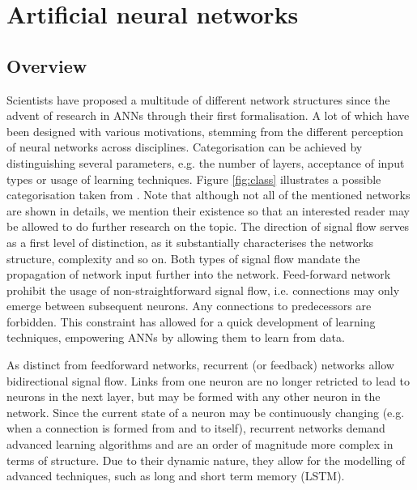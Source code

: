 \documentclass[10pt,a4paper,DIV=11]{scrreprt}
\begin{document}
\chapter{Artificial neural networks}
\label{ch:ANN}
\section{Overview}

Scientists have proposed a multitude of different network structures since the advent of research in ANNs through their first formalisation. 
A lot of which have been designed with various motivations, stemming from the different perception of neural networks across disciplines.
Categorisation can be achieved by distinguishing several parameters, e.g. the number of layers, acceptance of input types or usage of learning techniques.
Figure \ref{fig:class} illustrates a possible categorisation taken from \cite{NNGER}. Note that although not all of the mentioned networks are shown in details,
we mention their existence so that an interested reader may be allowed to do further research on the topic.
The direction of signal flow serves as a first level of distinction, as it substantially characterises the networks structure, complexity and so on.
Both types of signal flow mandate the propagation of network input further into the network.
Feed-forward network prohibit the usage of non-straightforward signal flow, i.e. connections may only emerge between subsequent neurons.
Any connections to predecessors are forbidden. This constraint has allowed for a quick development of learning techniques, empowering ANNs by 
allowing them to learn from data. 


As distinct from feedforward networks, recurrent (or feedback) networks allow bidirectional signal flow. 
Links from one neuron are no longer retricted to lead to neurons in the next layer, but may be formed with any other neuron in the network.
Since the current state of a neuron may be continuously changing (e.g. when a connection is formed from and to itself), recurrent networks 
demand advanced learning algorithms and are an order of magnitude more complex in terms of structure. Due to their dynamic nature, they allow 
for the modelling of advanced techniques, such as long and short term memory (LSTM).\cite{LSTM}
\end{document}
